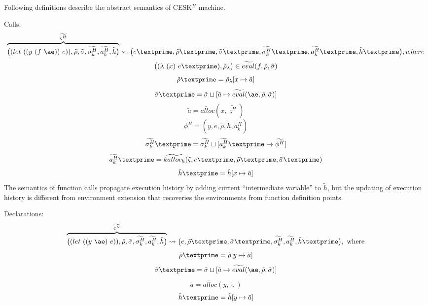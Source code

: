 \documentclass{article}
\begin{document}
Following definitions describe the abstract semantics of CESK$^H$ machine.

Calls:
\[
\overbrace{
\big((let\ ((y\ (f\ \ae))\ e)), \tilde{\rho}, \tilde{\sigma}, \widetilde{\sigma^H_k}, \widetilde{a^H_k}, \tilde{h} \big)
}^{\widetilde{\varsigma^H}}
\leadsto \big(e\textprime,\tilde{\rho}\textprime, \tilde{\sigma}\textprime, \widetilde{\sigma_k^H}\textprime, \widetilde{a_k^H}\textprime, \tilde{h}\textprime \big), where
\]
\[
\big((\lambda\ (x)\ e\textprime), \tilde{\rho}_{\lambda}  \big) \in \widetilde{eval}(f, \tilde{\rho}, \tilde{\sigma})
\]
\[
\tilde{\rho}\textprime = \tilde{\rho}_{\lambda}[x \mapsto \tilde{a}]
\]
\[
\tilde{\sigma}\textprime = \tilde{\sigma} \sqcup [\tilde{a} \mapsto \widetilde{eval}(\ae, \tilde{\rho}, \tilde{\sigma})]
\]
\[
\tilde{a} = \widetilde{alloc}(x, \widetilde{\varsigma^H})
\]
\[
\widetilde{\phi^H} = {(y, e, \tilde{\rho}, \tilde{h}, \widetilde{a_k^H})}
\]
\[
\widetilde{\sigma_k^H}\textprime = \widetilde{\sigma_k^H} \sqcup [\widetilde{a_k^H}\textprime \mapsto \widetilde{\phi^H}]
\]
\[
\widetilde{a_k^H}\textprime = \widetilde{kalloc_h}(\tilde{\varsigma}, e\textprime, \tilde{\rho}\textprime, \tilde{\sigma}\textprime)
\]
\[
\tilde{h}\textprime = \tilde{h}[x \mapsto \tilde{a}]
\]
The semantics of function calls propagate execution history by adding current ``intermediate variable'' to $\tilde{h}$, but the updating of execution history is different from environment extension that recoveries the environments from function definition points.

Declarations:
\[
\overbrace{
\big((let\ ((y\ \ae)\ e)), \tilde{\rho}, \tilde{\sigma}, \widetilde{\sigma^H_k}, \widetilde{a^H_k}, \tilde{h} \big)
}^{\widetilde{\varsigma^H}}
\leadsto \big(e,\tilde{\rho}\textprime, \tilde{\sigma}\textprime, \widetilde{\sigma^H_k}, \widetilde{a^H_k}, \tilde{h}\textprime \big), \mbox{ where}
\]
\[
\tilde{\rho}\textprime = \tilde{\rho}[y \mapsto \tilde{a}]
\]
\[
\tilde{\sigma}\textprime = \tilde{\sigma} \sqcup [\tilde{a} \mapsto \widetilde{eval}(\ae, \tilde{\rho}, \tilde{\sigma})]
\]
\[
\tilde{a} = \widetilde{alloc}(y, \tilde{\varsigma})
\]
\[
\tilde{h}\textprime = \tilde{h}[y \mapsto \tilde{a}]
\]
\end{document}
